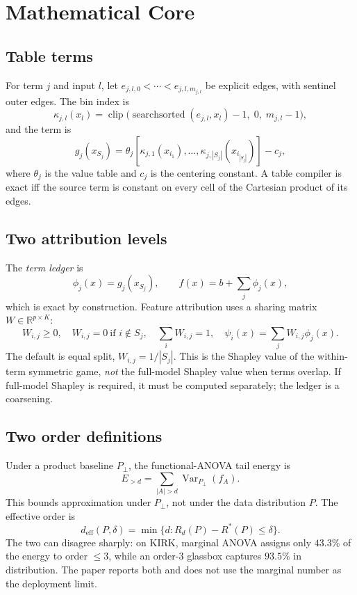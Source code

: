 \documentclass[twoside,11pt]{article}
\begin{document}
\section{Mathematical Core}

\subsection{Table terms}

For term $j$ and input $l$, let $e_{j,l,0}<\cdots<e_{j,l,m_{j,l}}$ be explicit
edges, with sentinel outer edges. The bin index is
\begin{equation}
  \kappa_{j,l}(x_l) = \operatorname{clip}\big(
  \operatorname{searchsorted}(e_{j,l},x_l)-1,\;0,\;m_{j,l}-1\big),
\end{equation}
and the term is
\begin{equation}
  g_j(x_{S_j}) = \theta_j[\kappa_{j,1}(x_{i_1}),\ldots,
  \kappa_{j,|S_j|}(x_{i_{|S_j|}})] - c_j,
\end{equation}
where $\theta_j$ is the value table and $c_j$ is the centering constant. A table
compiler is exact iff the source term is constant on every cell of the Cartesian
product of its edges.

\subsection{Two attribution levels}

The \emph{term ledger} is
\begin{equation}
  \phi_j(x) = g_j(x_{S_j}), \qquad f(x)=b+\sum_j \phi_j(x),
\end{equation}
which is exact by construction. Feature attribution uses a sharing matrix
$W\in\mathbb{R}^{p\times K}$:
\begin{equation}
  W_{i,j}\ge 0,\quad W_{i,j}=0\ \text{if }i\notin S_j,\quad
  \sum_i W_{i,j}=1,\quad
  \psi_i(x)=\sum_j W_{i,j}\phi_j(x).
\end{equation}
The default is equal split, $W_{i,j}=1/|S_j|$. This is the Shapley value of the
within-term symmetric game, \emph{not} the full-model Shapley value when terms
overlap. If full-model Shapley is required, it must be computed separately; the
ledger is a coarsening.

\subsection{Two order definitions}

Under a product baseline $P_\perp$, the functional-ANOVA tail energy is
\begin{equation}
  E_{>d}=\sum_{|A|>d}\operatorname{Var}_{P_\perp}(f_A).
\end{equation}
This bounds approximation under $P_\perp$, not under the data distribution $P$.
The effective order is
\begin{equation}
  d_{\mathrm{eff}}(P,\delta)=\min\{d:R_d(P)-R^*(P)\le \delta\}.
\end{equation}
The two can disagree sharply: on KIRK, marginal ANOVA assigns only $43.3\%$ of
the energy to order $\le3$, while an order-3 glassbox captures $93.5\%$ in
distribution. The paper reports both and does not use the marginal number as the
deployment limit.
\end{document}

